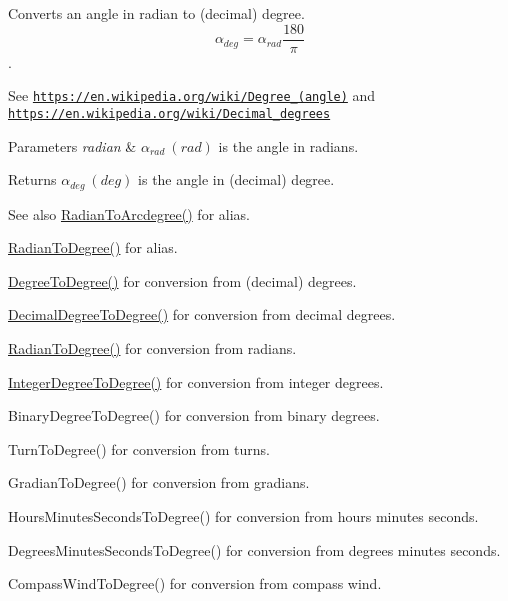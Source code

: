 Converts an angle in radian to (decimal) degree. \[\alpha_{deg}=\alpha_{rad}\frac{180}{\pi}\]. 

See \href{https://en.wikipedia.org/wiki/Degree_(angle)}{\tt https\+://en.\+wikipedia.\+org/wiki/\+Degree\+\_\+(angle)} and \href{https://en.wikipedia.org/wiki/Decimal_degrees}{\tt https\+://en.\+wikipedia.\+org/wiki/\+Decimal\+\_\+degrees} 
\begin{DoxyParams}{Parameters}
{\em radian} & $\alpha_{rad}\ (rad)$ is the angle in radians. \\
\hline
\end{DoxyParams}
\begin{DoxyReturn}{Returns}
$\alpha_{deg}\ (deg)$ is the angle in (decimal) degree. 
\end{DoxyReturn}
\begin{DoxySeeAlso}{See also}
\mbox{\hyperlink{group___e_g_x_math-_angle_conversions-_radian_ga3dfdc97357cc07f8379976bbc08f9852}{Radian\+To\+Arcdegree()}} for alias. 

\mbox{\hyperlink{group___e_g_x_math-_angle_conversions-_radian_ga25bbce6cdc1c3621f2a158d320e3bc45}{Radian\+To\+Degree()}} for alias. 

\mbox{\hyperlink{group___e_g_x_math-_angle_conversions-_degree_gaca157e7d3e99a46a11a04b92680d2574}{Degree\+To\+Degree()}} for conversion from (decimal) degrees. 

\mbox{\hyperlink{group___e_g_x_math-_angle_conversions-_decimal_degree_ga0aa7f2f5dbb00cf4ab303421c6e33ccf}{Decimal\+Degree\+To\+Degree()}} for conversion from decimal degrees. 

\mbox{\hyperlink{group___e_g_x_math-_angle_conversions-_radian_ga25bbce6cdc1c3621f2a158d320e3bc45}{Radian\+To\+Degree()}} for conversion from radians. 

\mbox{\hyperlink{group___e_g_x_math-_angle_conversions-_integer_degree_gaa9b63c6095fd7f8809fcfa2ba1e62235}{Integer\+Degree\+To\+Degree()}} for conversion from integer degrees. 

Binary\+Degree\+To\+Degree() for conversion from binary degrees. 

Turn\+To\+Degree() for conversion from turns. 

Gradian\+To\+Degree() for conversion from gradians. 

Hours\+Minutes\+Seconds\+To\+Degree() for conversion from hours minutes seconds. 

Degrees\+Minutes\+Seconds\+To\+Degree() for conversion from degrees minutes seconds. 

Compass\+Wind\+To\+Degree() for conversion from compass wind. 
\end{DoxySeeAlso}
\mbox{\label{group___e_g_x_math-_angle_conversions-_radian_gadae98c255924fdc8b232b6539eae81a9}} 
